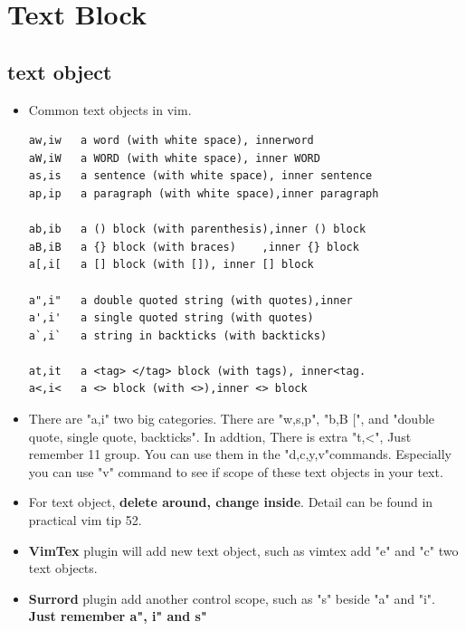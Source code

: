 \documentclass[a4paper,12pt,twoside]{book}
\begin{document}
\section{Text Block}

\subsection{text object}
\begin{itemize}
		\item Common text objects in vim. 
\begin{verbatim}
aw,iw	a word (with white space), innerword		
aW,iW	a WORD (with white space), inner WORD		
as,is	a sentence (with white space), inner sentence
ap,ip	a paragraph (with white space),inner paragraph
	
ab,ib	a () block (with parenthesis),inner () block
aB,iB	a {} block (with braces)	,inner {} block
a[,i[	a [] block (with []), inner [] block

a",i"	a double quoted string (with quotes),inner
a',i'	a single quoted string (with quotes)
a`,i`	a string in backticks (with backticks)

at,it	a <tag> </tag> block (with tags), inner<tag.
a<,i<	a <> block (with <>),inner <> block
\end{verbatim}

		\item There are "a,i" two big categories. There are "w,s,p", "b,B $[$", and "double quote, single quote, backticks". In addtion, There is extra "t,<", Just remember 11 group. You can use them in the "d,c,y,v"commands. Especially you can use "v" command to see if scope of these text objects in your text.  

		\item For text object,  \textbf{delete around, change inside}. Detail can be found in practical vim tip 52. 

		\item \textbf{VimTex} plugin will add new text object, such as vimtex add "e" and "c" two text objects. 

		\item \textbf{Surrord} plugin add another control scope, such as "s" beside "a" and "i".  \textbf{Just remember a", i" and s"}
\end{itemize}
\end{document}
